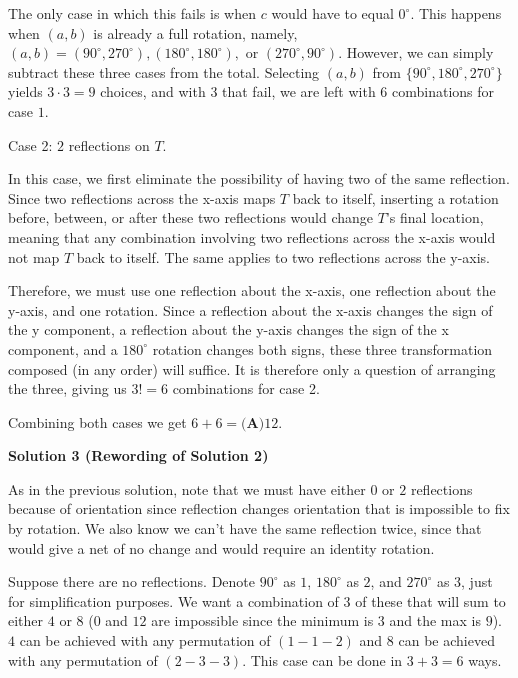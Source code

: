 \begin{enumerate}
 The only case in which this fails is when $c$ would have to equal $0^\circ$. This happens when $(a,b)$ is already a full rotation, namely, $(a,b) = (90^\circ,270^\circ),(180^\circ,180^\circ),$ or $(270^\circ,90^\circ)$. However, we can simply subtract these three cases from the total. Selecting $(a,b)$ from $\{90^\circ,180^\circ,270^\circ\}$ yields $3 \cdot 3 = 9$ choices, and with $3$ that fail, we are left with $6$ combinations for case $1$.

 


 Case 2: $2$ reflections on $T$.

 


 In this case, we first eliminate the possibility of having two of the same reflection. Since two reflections across the x-axis maps $T$ back to itself, inserting a rotation before, between, or after these two reflections would change $T$'s final location, meaning that any combination involving two reflections across the x-axis would not map $T$ back to itself. The same applies to two reflections across the y-axis.

 Therefore, we must use one reflection about the x-axis, one reflection about the y-axis, and one rotation. Since a reflection about the x-axis changes the sign of the y component, a reflection about the y-axis changes the sign of the x component, and a $180^\circ$ rotation changes both signs, these three transformation composed (in any order) will suffice. It is therefore only a question of arranging the three, giving us $3! = 6$ combinations for case 2.

 Combining both cases we get $6+6=\boxed{\textbf{(A)}  12}$.

 



\textbf{Solution 3 (Rewording of Solution 2)}

As in the previous solution, note that we must have either $0$ or $2$ reflections because of orientation since reflection changes orientation that is impossible to fix by rotation. We also know we can't have the same reflection twice, since that would give a net of no change and would require an identity rotation.

 Suppose there are no reflections. Denote $90^{\circ}$ as $1$, $180^{\circ}$ as $2$, and $270^{\circ}$ as $3$, just for simplification purposes. We want a combination of $3$ of these that will sum to either $4$ or $8$ ($0$ and $12$ are impossible since the minimum is $3$ and the max is $9$). $4$ can be achieved with any permutation of $(1-1-2)$ and $8$ can be achieved with any permutation of $(2-3-3)$. This case can be done in $3+3=6$ ways.


\end{enumerate}
